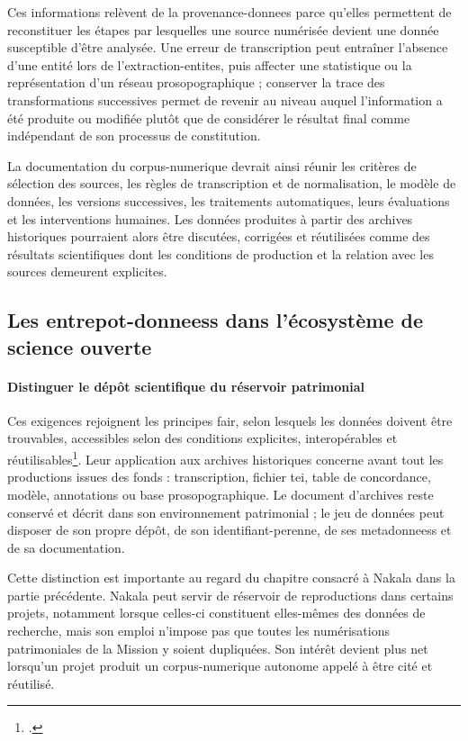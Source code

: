 Ces informations relèvent de la \gls{provenance-donnees} parce qu'elles permettent de reconstituer les étapes par lesquelles une source numérisée devient une donnée susceptible d'être analysée. Une erreur de transcription peut entraîner l'absence d'une entité lors de l'\gls{extraction-entites}, puis affecter une statistique ou la représentation d'un réseau prosopographique ; conserver la trace des transformations successives permet de revenir au niveau auquel l'information a été produite ou modifiée plutôt que de considérer le résultat final comme indépendant de son processus de constitution.

La documentation du \gls{corpus-numerique} devrait ainsi réunir les critères de sélection des sources, les règles de transcription et de normalisation, le modèle de données, les versions successives, les traitements automatiques, leurs évaluations et les interventions humaines. Les données produites à partir des archives historiques pourraient alors être discutées, corrigées et réutilisées comme des résultats scientifiques dont les conditions de production et la relation avec les sources demeurent explicites.


\subsection{Les \glspl{entrepot-donnees} dans l'écosystème de science ouverte}

\paragraph{Distinguer le dépôt scientifique du réservoir patrimonial}

Ces exigences rejoignent les principes \gls{fair}, selon lesquels les données doivent être trouvables, accessibles selon des conditions explicites, interopérables et réutilisables\footcite{WilkinsonEtAl2016}. Leur application aux archives historiques concerne avant tout les productions issues des fonds : transcription, fichier \gls{tei}, table de concordance, modèle, annotations ou base prosopographique. Le document d'archives reste conservé et décrit dans son environnement patrimonial ; le jeu de données peut disposer de son propre dépôt, de son \gls{identifiant-perenne}, de ses \glspl{metadonnees} et de sa documentation.

Cette distinction est importante au regard du chapitre consacré à Nakala dans la partie précédente. Nakala peut servir de réservoir de reproductions dans certains projets, notamment lorsque celles-ci constituent elles-mêmes des données de recherche, mais son emploi n'impose pas que toutes les numérisations patrimoniales de la Mission y soient dupliquées. Son intérêt devient plus net lorsqu'un projet produit un \gls{corpus-numerique} autonome appelé à être cité et réutilisé.

